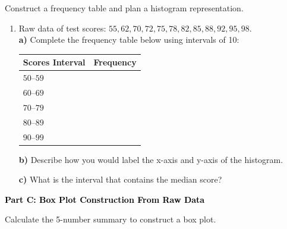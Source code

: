 \documentclass[12pt, letterpaper, fleqn]{article}
\newcommand{\blankshorter}{\underline{\hspace{1.5cm}}}
\begin{document}
\vspace{3mm}

\noindent
Construct a frequency table and plan a histogram representation.

\vspace{5mm}

\begin{enumerate}[itemsep=2.5cm, leftmargin=0.6cm]
\item Raw data of test scores: $55, 62, 70, 72, 75, 78, 82, 85, 88, 92, 95, 98$. \\
\textbf{a)} Complete the frequency table below using intervals of 10:
\begin{center}
\begin{tabular}{|l|c|}
\hline
\textbf{Scores Interval} & \textbf{Frequency} \\ \hline
$50\text{--}59$ & \blankshorter \\ \hline
$60\text{--}69$ & \blankshorter \\ \hline
$70\text{--}79$ & \blankshorter \\ \hline
$80\text{--}89$ & \blankshorter \\ \hline
$90\text{--}99$ & \blankshorter \\
\hline
\end{tabular}
\end{center}
\vspace{0.5cm}

\textbf{b)} Describe how you would label the x-axis and y-axis of the histogram. \\ 
\vspace{4cm}

\textbf{c)} What is the interval that contains the median score? \\
\vspace{4cm}
\end{enumerate}

\newpage

\begin{tcolorbox}[colback=black!10]
    \large\textcolor{black}{\textbf{Part C: Box Plot Construction From Raw Data}}
\end{tcolorbox}

\vspace{3mm}

\noindent
Calculate the 5-number summary to construct a box plot.
\end{document}
